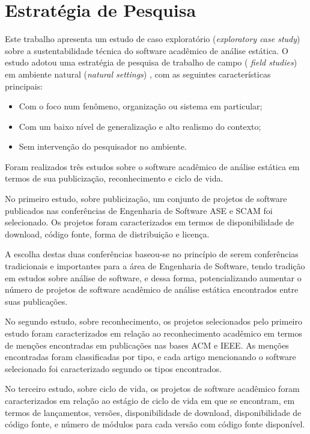 \section{Estratégia de Pesquisa}

Este trabalho apresenta um estudo de caso exploratório ({\it exploratory case
study}) sobre a sustentabilidade técnica do software acadêmico de análise
estática. O estudo adotou uma estratégia de pesquisa de trabalho de campo ({\it
field studies}) em ambiente natural ({\it natural settings})
\cite{stol2015holistic}, com as seguintes características principais:

\begin{itemize}
  \item Com o foco num fenômeno, organização ou sistema em particular;
  \item Com um baixo nível de generalização e alto realismo do contexto;
  \item Sem intervenção do pesquisador no ambiente.
\end{itemize}

Foram realizados três estudos sobre o software acadêmico de análise estática em
termos de sua publicização, reconhecimento e ciclo de vida.

No primeiro estudo, sobre publicização, um conjunto de projetos de software
publicados nas conferências de Engenharia de Software ASE e SCAM foi
selecionado. Os projetos foram caracterizados em termos de disponibilidade de
download, código fonte, forma de distribuição e licença.

A escolha destas duas conferências baseou-se no princípio de serem conferências
tradicionais e importantes para a área de Engenharia de Software, tendo
tradição em estudos sobre análise de software, e dessa forma, potencializando
aumentar o número de projetos de software acadêmico de análise estática
encontrados entre suas publicações.

No segundo estudo, sobre reconhecimento, os projetos selecionados pelo primeiro
estudo foram caracterizados em relação ao reconhecimento acadêmico em termos de
menções encontradas em publicações nas bases ACM e IEEE. As menções
encontradas foram classificadas por tipo, e cada artigo mencionando o software
selecionado foi caracterizado segundo os tipos encontrados.

No terceiro estudo, sobre ciclo de vida, os projetos de software acadêmico
foram caracterizados em relação ao estágio de ciclo de vida em que se
encontram, em termos de lançamentos, versões, disponibilidade de download,
disponibilidade de código fonte, e número de módulos para cada versão com
código fonte disponível.

